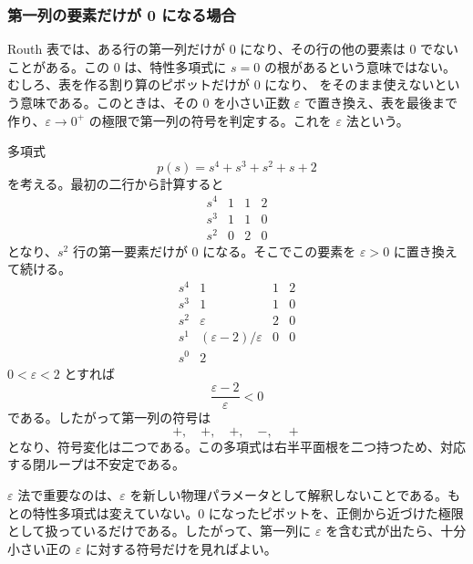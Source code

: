\subsubsection{第一列の要素だけが 0 になる場合}

Routh 表では、ある行の第一列だけが 0 になり、その行の他の要素は 0 でないことがある。この 0 は、特性多項式に $s=0$ の根があるという意味ではない。むしろ、表を作る割り算のピボットだけが 0 になり、 をそのまま使えないという意味である。このときは、その 0 を小さい正数 $\varepsilon$ で置き換え、表を最後まで作り、$\varepsilon\to0^+$ の極限で第一列の符号を判定する。これを $\varepsilon$ 法という。

\begin{example}
多項式
\begin{equation}
  p(s)=s^4+s^3+s^2+s+2
\end{equation}
を考える。最初の二行から計算すると
\begin{equation}
\begin{array}{c|ccc}
s^4&1&1&2\\
s^3&1&1&0\\
s^2&0&2&0
\end{array}
\end{equation}
となり、$s^2$ 行の第一要素だけが 0 になる。そこでこの要素を $\varepsilon>0$ に置き換えて続ける。
\begin{equation}
\begin{array}{c|ccc}
s^4&1&1&2\\
s^3&1&1&0\\
s^2&\varepsilon&2&0\\
s^1&(\varepsilon-2)/\varepsilon&0&0\\
s^0&2&&
\end{array}
\end{equation}
$0<\varepsilon<2$ とすれば
\begin{equation}
  \frac{\varepsilon-2}{\varepsilon}<0
\end{equation}
である。したがって第一列の符号は
\begin{equation}
  +,\quad +,\quad +,\quad -,\quad +
\end{equation}
となり、符号変化は二つである。この多項式は右半平面根を二つ持つため、対応する閉ループは不安定である。
\end{example}

$\varepsilon$ 法で重要なのは、$\varepsilon$ を新しい物理パラメータとして解釈しないことである。もとの特性多項式は変えていない。0 になったピボットを、正側から近づけた極限として扱っているだけである。したがって、第一列に $\varepsilon$ を含む式が出たら、十分小さい正の $\varepsilon$ に対する符号だけを見ればよい。

